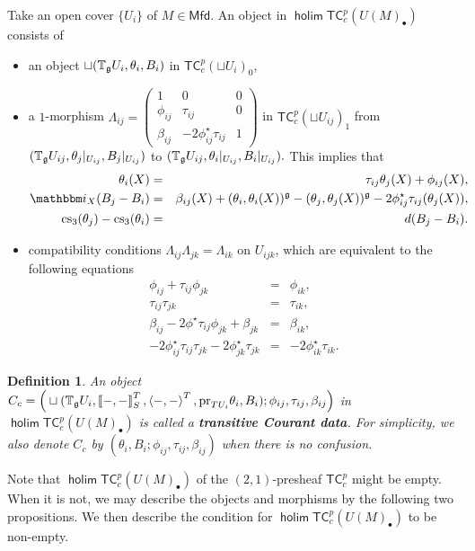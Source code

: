\documentclass[letterpaper,10pt, oneside]{article} %
\newtheorem{defi}[thm]{Definition}
\newcommand{\Mfd}{\mathsf{Mfd}}%
\newcommand{\tcalgdp}{{\mathsf{TC}^{p}_{c}}} %
\DeclareMathOperator{\holim}{\mathsf{holim}}
\newcommand{\tagui}{{\mathbb{T}_\g U_i}}
\newcommand{\taguij}{{\mathbb{T}_\g U_{ij}}}
\newcommand{\ii}{\mathbbm i}
\newcommand{\cs}{\mathrm{cs}}
\newcommand{\pair}[1]{\left\langle #1\right\rangle}
\newcommand{\Courant}[1]{\left\llbracket  #1\right\rrbracket }
\newcommand{\pr}{\mathrm{pr}}
\begin{document}
Take an open cover $\{U_i\}$ of $M\in
\Mfd$. An object in $\holim \tcalgdp(U(M)_\bullet)$ consists of
\begin{itemize}
\item  an object $\sqcup (\tagui,
  \theta_i,B_i)$ in $\tcalgdp(\sqcup U_i)_0$,

\item a $1$-morphism $\Lambda_{ij}=\left(\begin{array}{ccc}
1&0&0\\
\phi_{ij}&\tau_{ij}&0\\
\beta_{ij}&-2\phi_{ij}^\star\tau_{ij}&1
\end{array}\right)$ in $\tcalgdp(\sqcup U_{ij})_1$ from $(\taguij,\theta_j|_{U_{ij}}, B_j|_{U_{ij}})$ to $(\taguij,    \theta_i|_{U_{ij}}, B_i|_{U_{ij}}).
$
This implies that
\begin{eqnarray}
\label{eq:morcon11} \theta_i(X)&=&\tau_{ij}\theta_j(X)+\phi_{ij}(X),\\
\label{eq:morcon22} \ii_X(B_j-B_i)&=&\beta_{ij}(X)+(\theta_i,\theta_i(X))^\g-(\theta_j,\theta_j(X))^\g-2\phi_{ij}^\star\tau_{ij}(\theta_j(X)),\\
\label{eq:morcon33}\cs_3(\theta_j)-\cs_3(\theta_i)&=&d(B_j-B_i).
\end{eqnarray}
\item compatibility conditions $\Lambda_{ij}\Lambda_{jk}=\Lambda_{ik}$ on $U_{ijk}$, which are equivalent to the following equations
     \begin{eqnarray*}
      \phi_{ij}+\tau_{ij}\phi_{jk}&=&\phi_{ik},\\
      \tau_{ij}\tau_{jk}&=&\tau_{ik},\\
      \beta_{ij}-2\phi^\star \tau_{ij}\phi_{jk}+\beta_{jk}&=&\beta_{ik},\\
      -2\phi_{ij}^\star\tau_{ij}\tau_{jk}-2\phi_{jk}^\star\tau_{jk}&=&-2\phi_{ik}^\star\tau_{ik}.
    \end{eqnarray*}
\end{itemize}


\begin{defi}
An object $C_c=\Big(\sqcup(\tagui, \Courant{-,-}^T_S,  \pair{-,-}^T,\pr_{TU_i}\theta_i,B_i);\phi_{ij},\tau_{ij},\beta_{ij} \Big)$ in $\holim \tcalgdp(U(M)_\bullet)$ is called a {\bf transitive Courant data}. For simplicity, we also denote $C_c$ by  $(\theta_i, B_i;\phi_{ij},\tau_{ij},\beta_{ij})$ when there is no confusion.
\end{defi}

Note that $\holim \tcalgdp(U(M)_\bullet)$ of the $(2,1)$-presheaf $\tcalgdp$ might be empty. When it is not, we may describe the objects and morphisms by the following two propositions. We then describe the condition for  $\holim \tcalgdp(U(M)_\bullet)$ to be non-empty.
\end{document}

